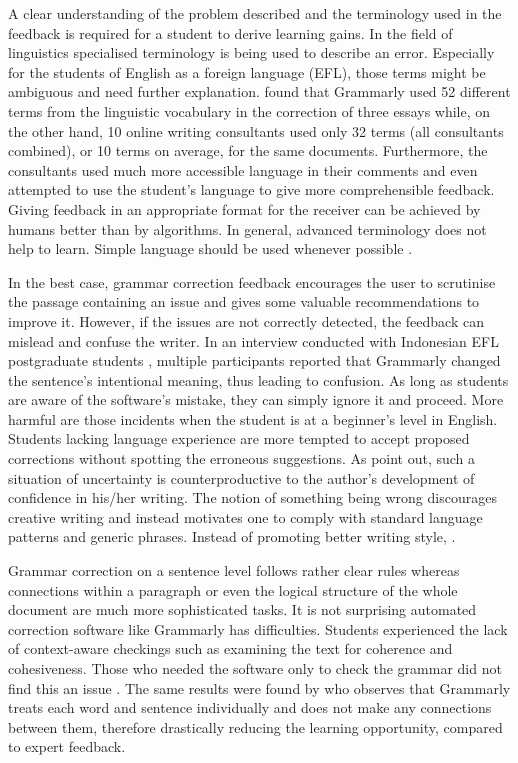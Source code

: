\documentclass[runningheads]{llncs}
\let\OldTextregistered\textregistered
\renewcommand{\textregistered}{\OldTextregistered\xspace}
\begin{document}
A clear understanding of the problem described and the terminology used in the feedback is required for a student to derive learning gains. In the field of linguistics specialised terminology is being used to describe an error. Especially for the students of English as a foreign language (EFL), those terms might be ambiguous and need further explanation. \textcite{dembsey_closing_2017} found that Grammarly\textregistered used 52 different terms from the linguistic vocabulary in the correction of three essays while, on the other hand, 10 online writing consultants used only 32 terms (all consultants combined), or 10 terms on average, for the same documents. Furthermore, the consultants used much more accessible language in their comments and even attempted to use the student's language to give more comprehensible feedback. Giving feedback in an appropriate format for the receiver can be achieved by humans better than by algorithms. In general, advanced terminology does not help to learn. Simple language should be used whenever possible \citep{dembsey_closing_2017}.

In the best case, grammar correction feedback encourages the user to scrutinise the passage containing an issue and gives some valuable recommendations to improve it. However, if the issues are not correctly detected, the feedback can mislead and confuse the writer. In an interview conducted with Indonesian EFL postgraduate students \citep{nova_utilizing_2018}, multiple participants reported that Grammarly\textregistered changed the sentence's intentional meaning, thus leading to confusion. As long as students are aware of the software's mistake, they can simply ignore it and proceed. More harmful are those incidents when the student is at a beginner's level in English. Students lacking language experience are more tempted to accept proposed corrections without spotting the erroneous suggestions. As \textcite{vojak_new_2011} point out, such a situation of uncertainty is counterproductive to the author's development of confidence in his/her writing. The notion of something being wrong discourages creative writing and instead motivates one to comply with standard language patterns and generic phrases. Instead of promoting better writing style, \citeauthor{vojak_new_2011} . 

Grammar correction on a sentence level follows rather clear rules whereas connections within a paragraph or even the logical structure of the whole document are much more sophisticated tasks. It is not surprising automated correction software like Grammarly\textregistered has difficulties. Students experienced the lack of context-aware checkings such as examining the text for coherence and cohesiveness. Those who needed the software only to check the grammar did not find this an issue \citep{nova_utilizing_2018}. The same results were found by \textcite{dembsey_closing_2017} who observes that Grammarly\textregistered treats each word and sentence individually and does not make any connections between them, therefore drastically reducing the learning opportunity, compared to expert feedback.
\end{document}
